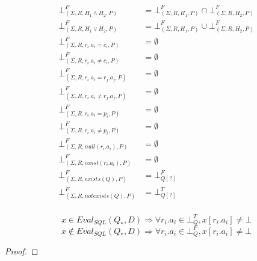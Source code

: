 \begin{mydef}
	\begin{align*}
		\bot^F_{(\Sigma,R,H_1 \land H_2,P)} & = \bot^F_{(\Sigma,R,H_1,P)} \cap \bot^F_{(\Sigma,R,H_2,P)} \\
		\bot^F_{(\Sigma,R,H_1 \lor H_2,P)} & = \bot^F_{(\Sigma,R,H_1,P)} \cup \bot^F_{(\Sigma,R,H_2,P)} \\
		\bot^F_{(\Sigma,R,r_i.a_i = c_i,P)} & =\emptyset \\
		\bot^F_{(\Sigma,R,r_i.a_i \neq c_i,P)} & = \emptyset \\
		\bot^F_{(\Sigma,R,r_i.a_i = r_j.a_j,P)} & = \emptyset \\
		\bot^F_{(\Sigma,R,r_i.a_i \neq r_j.a_j,P)} & = \emptyset \\
		\bot^F_{(\Sigma,R,r_i.a_i = p_i,P)} & = \emptyset\\
		\bot^F_{(\Sigma,R,r_i.a_i \neq p_i,P)} & = \emptyset \\
		\bot^F_{(\Sigma,R,null(r_i.a_i),P)} & = \emptyset \\
		\bot^F_{(\Sigma,R,const(r_i.a_i),P)} & = \emptyset \\
		\bot^F_{(\Sigma,R,exists(Q),P)} & = \bot^F_{Q[?]} \\
		\bot^F_{(\Sigma,R,notexists(Q),P)} & = \bot^T_{Q[?]}\\
	\end{align*}
\end{mydef}

\begin{myprop}
	$$x \in Eval_{SQL}(Q_*,D)  \Rightarrow \forall r_i.a_i \in \bot^T_Q, x[r_i.a_i] \neq \bot$$
	$$x \notin Eval_{SQL}(Q_*,D)  \Rightarrow \forall r_i.a_i \in \bot^F_Q, x[r_i.a_i] \neq \bot$$
\end{myprop}

\begin{proof}
			
\end{proof}


